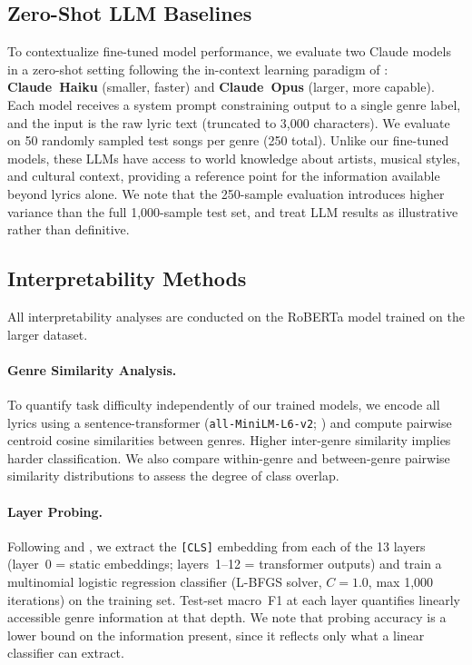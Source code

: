 \documentclass[11pt,a4paper]{article}
\begin{document}
\subsection{Zero-Shot LLM Baselines}

To contextualize fine-tuned model performance, we evaluate two Claude
models \citep{anthropic2025claude_opus4, anthropic2025claude_haiku45} in a zero-shot setting following the
in-context learning paradigm of \citet{brown2020language}:
\textbf{Claude~Haiku} (smaller, faster) and \textbf{Claude~Opus}
(larger, more capable).
Each model receives a system prompt constraining output to a single
genre label, and the input is the raw lyric text (truncated to 3{,}000
characters).
We evaluate on 50 randomly sampled test songs per genre (250 total).
Unlike our fine-tuned models, these LLMs have access to world
knowledge about artists, musical styles, and cultural context, providing
a reference point for the information available beyond lyrics alone.
We note that the 250-sample evaluation introduces higher variance than
the full 1{,}000-sample test set, and treat LLM results as illustrative
rather than definitive.

\subsection{Interpretability Methods}

All interpretability analyses are conducted on the RoBERTa model
trained on the larger dataset.

\paragraph{Genre Similarity Analysis.}
To quantify task difficulty independently of our trained models, we
encode all lyrics using a sentence-transformer
(\texttt{all-MiniLM-L6-v2}; \citealp{reimers2019sentence}) and compute
pairwise centroid cosine similarities between genres.
Higher inter-genre similarity implies harder classification.
We also compare within-genre and between-genre pairwise similarity
distributions to assess the degree of class overlap.

\paragraph{Layer Probing.}
Following \citet{conneau2018probing} and \citet{tenney2019bert}, we
extract the \texttt{[CLS]} embedding from each of the 13 layers
(layer~0 = static embeddings; layers~1--12 = transformer outputs) and
train a multinomial logistic regression classifier
(L-BFGS solver, $C=1.0$, max 1{,}000 iterations) on the training set.
Test-set macro~F1 at each layer quantifies linearly accessible genre
information at that depth.
We note that probing accuracy is a lower bound on the information
present, since it reflects only what a linear classifier can extract.
\end{document}
